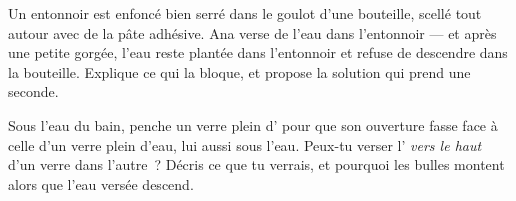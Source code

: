 \begin{exercise}[$\star\star$]\label{exo:g2:air-around-us:9}
Un entonnoir est enfoncé bien serré dans le goulot d'une bouteille,
scellé tout autour avec de la pâte adhésive. Ana verse de l'eau dans
l'entonnoir --- et après une petite gorgée, l'eau reste plantée dans
l'entonnoir et refuse de descendre dans la bouteille. Explique ce qui
la bloque, et propose la solution qui prend une seconde.
\end{exercise}

\begin{exercise}[$\star\star$]\label{exo:g2:air-around-us:10}
Sous l'eau du bain, penche un verre plein d' pour que son
ouverture fasse face à celle d'un verre plein d'eau, lui aussi sous
l'eau. Peux-tu verser l' \emph{vers le haut} d'un verre dans
l'autre~? Décris ce que tu verrais, et pourquoi les bulles montent
alors que l'eau versée descend.
\end{exercise}
